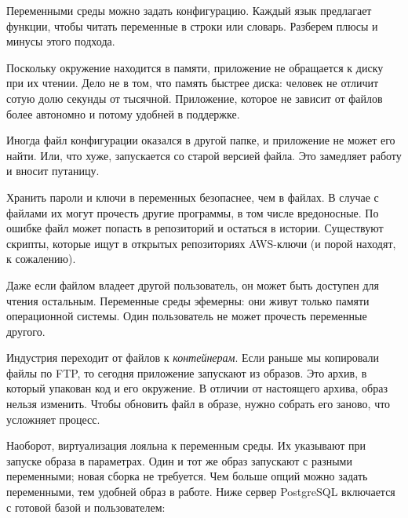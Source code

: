 Переменными среды можно задать конфигурацию. Каждый язык предлагает функции,
чтобы читать переменные в строки или словарь. Разберем плюсы и минусы этого
подхода.

Поскольку окружение находится в памяти, приложение не обращается к диску при их
чтении. Дело не в том, что память быстрее диска: человек не отличит сотую долю
секунды от тысячной. Приложение, которое не зависит от файлов более автономно и
потому удобней в поддержке.

Иногда файл конфигурации оказался в другой папке, и приложение не может его
найти. Или, что хуже, запускается со старой версией файла. Это замедляет работу
и вносит путаницу.

\label{password-note}


Хранить пароли и ключи в переменных безопаснее, чем в файлах. В случае с файлами
их могут прочесть другие программы, в том числе вредоносные. По ошибке файл
может попасть в репозиторий и остаться в истории. Существуют скрипты, которые
ищут в открытых репозиториях AWS-ключи (и порой находят, к сожалению).

Даже если файлом владеет другой пользователь, он может быть доступен для чтения
остальным. Переменные среды эфемерны: они живут только памяти операционной
системы. Один пользователь не может прочесть переменные другого.


Индустрия переходит от файлов к \emph{контейнерам}. Если раньше мы копировали
файлы по FTP, то сегодня приложение запускают из образов. Это архив, в который
упакован код и его окружение. В отличии от настоящего архива, образ нельзя
изменить. Чтобы обновить файл в образе, нужно собрать его заново, что усложняет
процесс.


Наоборот, виртуализация лояльна к переменным среды. Их указывают при запуске
образа в параметрах. Один и тот же образ запускают с разными переменными; новая
сборка не требуется. Чем больше опций можно задать переменными, тем удобней
образ в работе. Ниже сервер PostgreSQL включается с готовой базой и
пользователем:

\begin{english}
\end{english}

